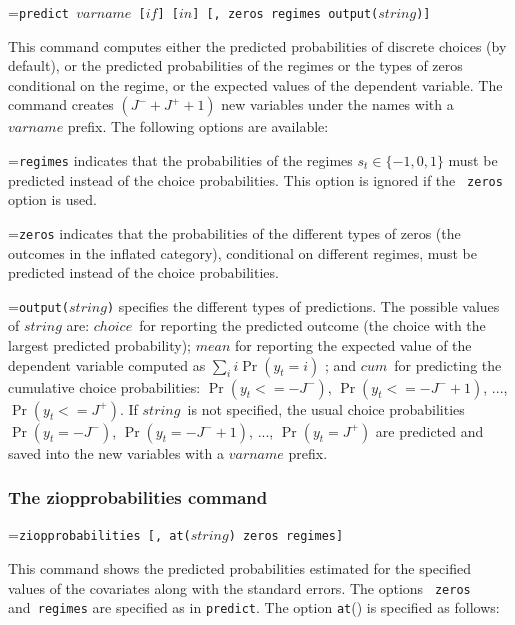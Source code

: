 \documentclass[letterpaper,fleqn,12pt]{article}
\begin{document}
\hangindent=\parindent\noindent \texttt{predict $varname$ [$if$] [$in$] [,
zeros regimes output($string$)]}

\smallskip

This command computes either the predicted probabilities of discrete choices
(by default), or the predicted probabilities of the regimes or the types of
zeros conditional on the regime, or the expected values of the dependent
variable. The command creates $(J^{-}+J^{+}+1)$ new variables under the
names with a \texttt{$varname$} prefix. The following options are available:

\smallskip

\smallskip \hangindent=\parindent\noindent \texttt{regimes} indicates that
the probabilities of the regimes $s_{t}\in \{-1,0,1\}$ must be predicted
instead of the choice probabilities. This option is ignored if the \texttt{%
zeros} option is used.

\medskip

\hangindent=\parindent\noindent \texttt{zeros} indicates that the
probabilities of the different types of zeros (the outcomes in the inflated
category), conditional on different regimes, must be predicted instead of
the choice probabilities.

\smallskip

\hangindent=\parindent\noindent \texttt{output($string$)} specifies the
different types of predictions. The possible values of \texttt{$string$}
are: \texttt{$choice$}\ for reporting the predicted outcome (the choice with
the largest predicted probability); \texttt{$mean$} for reporting the
expected value of the dependent variable computed as $\sum_{i}i\Pr (y_{t}=i)$%
; and \texttt{$cum$}\ for predicting the cumulative choice probabilities: $%
\Pr (y_{t}<=-J^{-})$, $\Pr (y_{t}<=-J^{-}+1)$, ..., $\Pr (y_{t}<=J^{+})$. If 
\texttt{$string$ }is not specified, the usual choice probabilities $\Pr
(y_{t}=-J^{-})$, $\Pr (y_{t}=-J^{-}+1)$, ..., $\Pr (y_{t}=J^{+})$ are
predicted and saved into the new variables with a \texttt{$varname$} prefix.

\subsubsection*{The ziopprobabilities command}

\hangindent=\parindent\noindent \texttt{ziopprobabilities [, at($string$)
zeros regimes]}

\smallskip

This command shows the predicted probabilities estimated for the specified
values of the covariates along with the standard errors. The options \texttt{%
zeros} and\texttt{\ regimes} are specified as in \texttt{predict}. The
option \texttt{at}() is specified as follows:\smallskip
\end{document}
